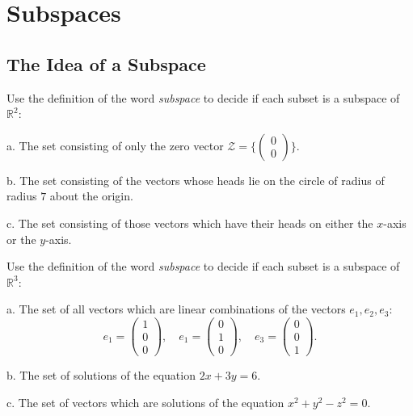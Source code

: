 \documentclass[cahier-main.tex]{subfiles}
\begin{document}
\chapter{Subspaces}

\section*{The Idea of a Subspace}

\begin{task} Use the definition of the word \emph{subspace} to decide if each subset is a subspace of $\mathbb{R}^2$:
\begin{compactenum}
\item[a.] The set consisting of only the zero vector $\mathcal{Z} = \{\left(\begin{smallmatrix} 0 \\ 0 \end{smallmatrix}\right)\}$.
\item[b.] The set consisting of the vectors whose heads lie on the circle of radius of radius $7$ about the origin.
\item[c.] The set consisting of those vectors which have their heads on either the $x$-axis or the $y$-axis.
\end{compactenum}
\end{task}

\begin{task} Use the definition of the word \emph{subspace} to decide if each subset is a subspace of $\mathbb{R}^3$:
\begin{compactenum}
\item[a.] The set of all vectors which are linear combinations of the vectors $e_1, e_2, e_3$:
\[
e_1 = \begin{pmatrix} 1 \\ 0 \\ 0 \end{pmatrix}, \quad e_1 = \begin{pmatrix} 0 \\ 1 \\ 0 \end{pmatrix}, \quad e_3 = \begin{pmatrix} 0 \\ 0 \\ 1 \end{pmatrix}.
\]
\item[b.] The set of solutions of the equation $2x + 3y = 6$.
\item[c.] The set of vectors which are solutions of the equation $x^2+y^2-z^2 = 0$.
\end{compactenum}
\end{task}
\end{document}
